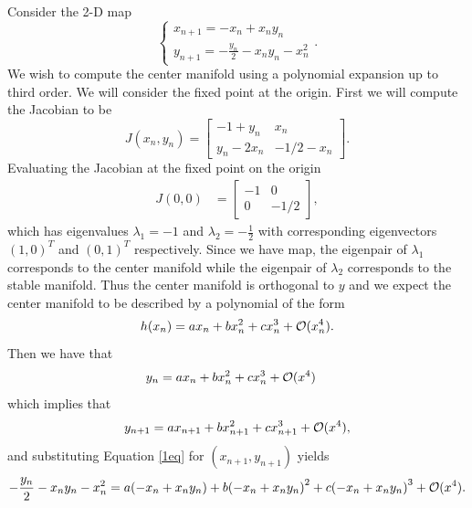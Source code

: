 \documentclass[12pt]{report}
\begin{document}
\begin{solution}

    \noindent
    Consider the 2-D map
    \begin{equation}\label{1eq}
        \left\{\begin{array}{l}
        x_{n+1} = -x_n + x_n y_n \\
        y_{n+1} = - \frac{y_n}{2} - x_n y_n - x_n^2  
        \end{array}\right..
    \end{equation}
    We wish to compute the center manifold using a polynomial expansion up to third order. We will consider the fixed point at the origin. First we will compute the Jacobian to be
    \[ 
        J(x_n,y_n) = \begin{bmatrix}
            -1 + y_n & x_n\\
            y_n - 2x_n & -1/2 - x_n
        \end{bmatrix}.
    \]
    Evaluating the Jacobian at the fixed point on the origin
    \begin{align*}
        J(0,0) &= \begin{bmatrix}
            -1 & 0 \\ 0 & -1/2
        \end{bmatrix},
    \end{align*} 
    which has eigenvalues $\lambda_1 = -1$ and $\lambda_2 = -\frac{1}{2}$ with corresponding eigenvectors $(1,0)^T$ and $(0,1)^T$ respectively. Since we have map, the eigenpair of $\lambda_1$ corresponds to the center manifold while the eigenpair of $\lambda_2$ corresponds to the stable manifold. Thus the center manifold is orthogonal to $y$ and we expect the center manifold to be described by a polynomial of the form
    \[ 
        h(x_n) = ax_n + bx_n^2 + cx_n^3 + {\mathcal{O}}(x_n^4).
    \]  
    Then we have that
    \begin{align*}
        y_n &= ax_n + bx_n^2 + cx_n^3 + {\mathcal{O}}(x^4)
    \end{align*}
    which implies that
    \[ 
        y_{n+1} = ax_{n+1} + bx_{n+1}^2 + cx_{n+1}^3 + {\mathcal{O}}(x^4),
        \]
        and substituting Equation \ref{1eq} for $(x_{n+1},y_{n+1})$ yields
        \[ 
            -\frac{y_n}{2} - x_ny_n - x_n^2 = a{\left(-x_n + x_ny_n\right)} + b{\left(-x_n + x_ny_n\right)}^2 + c{\left(-x_n + x_ny_n\right)}^3 + {\mathcal{O}}(x^4).
            \]
            \begin{figure}
                \centering

\end{figure}
\end{solution}
\end{document}
